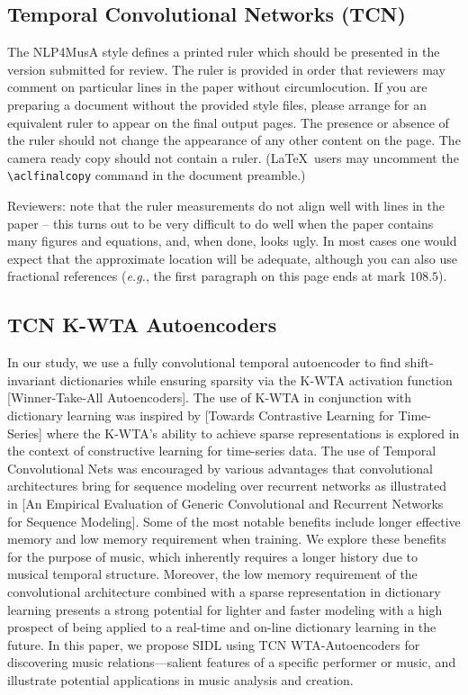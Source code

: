 \documentclass[11pt,a4paper]{article}
\begin{document}
\subsection{Temporal Convolutional Networks (TCN) }
The NLP4MusA style defines a printed ruler which should be presented in the
version submitted for review.  The ruler is provided in order that
reviewers may comment on particular lines in the paper without
circumlocution.  If you are preparing a document without the provided
style files, please arrange for an equivalent ruler to
appear on the final output pages.  The presence or absence of the ruler
should not change the appearance of any other content on the page.  The
camera ready copy should not contain a ruler. (\LaTeX\ users may uncomment the {\small\verb|\aclfinalcopy|} command in the document preamble.)  

Reviewers: note that the ruler measurements do not align well with
lines in the paper -- this turns out to be very difficult to do well
when the paper contains many figures and equations, and, when done,
looks ugly. In most cases one would expect that the approximate
location will be adequate, although you can also use fractional
references (\emph{e.g.}, the first paragraph on this page ends at mark $108.5$).

\subsection{TCN K-WTA Autoencoders}

In our study, we use a fully convolutional temporal autoencoder to find shift-invariant dictionaries while ensuring sparsity via the K-WTA activation function [Winner-Take-All Autoencoders]. The use of K-WTA in conjunction with dictionary learning was inspired by [Towards Contrastive Learning for Time-Series] where the K-WTA’s ability to achieve sparse representations is explored in the context of constructive learning for time-series data. The use of Temporal Convolutional Nets was encouraged by various advantages that convolutional architectures bring for sequence modeling over recurrent networks as illustrated in [An Empirical Evaluation of Generic Convolutional and Recurrent Networks for Sequence Modeling]. Some of the most notable benefits include longer effective memory and low memory requirement when training. We explore these benefits for the purpose of music, which inherently requires a longer history due to musical temporal structure. Moreover, the low memory requirement of the convolutional architecture combined with a sparse representation in dictionary learning presents a strong potential for lighter and faster modeling with a high prospect of being applied to a real-time and on-line dictionary learning in the future. In this paper, we propose SIDL using TCN WTA-Autoencoders for discovering music relations—salient features of a specific performer or music, and illustrate potential applications in music analysis and creation. 
\end{document}
